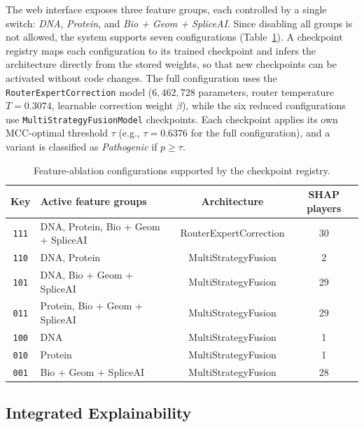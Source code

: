 The web interface exposes three feature groups, each controlled by a single switch: \textit{DNA}, \textit{Protein}, and \textit{Bio + Geom + SpliceAI}. Since disabling all groups is not allowed, the system supports seven configurations (Table~\ref{tab:ablation_configs}). A checkpoint registry maps each configuration to its trained checkpoint and infers the architecture directly from the stored weights, so that new checkpoints can be activated without code changes. The full configuration uses the \texttt{RouterExpertCorrection} model ($6{,}462{,}728$ parameters, router temperature $T = 0.3074$, learnable correction weight $\beta$), while the six reduced configurations use \texttt{MultiStrategyFusionModel} checkpoints. Each checkpoint applies its own MCC-optimal threshold $\tau$ (e.g., $\tau = 0.6376$ for the full configuration), and a variant is classified as \textit{Pathogenic} if $p \geq \tau$.

\begin{table}[htbp]
    \centering
    \caption{Feature-ablation configurations supported by the checkpoint registry.}
    \label{tab:ablation_configs}
    \begin{tabular}{clcc}
        \toprule
        \textbf{Key} & \textbf{Active feature groups} & \textbf{Architecture} & \textbf{SHAP players} \\
        \midrule
        \texttt{111} & DNA, Protein, Bio + Geom + SpliceAI & RouterExpertCorrection & 30 \\
        \texttt{110} & DNA, Protein & MultiStrategyFusion & 2 \\
        \texttt{101} & DNA, Bio + Geom + SpliceAI & MultiStrategyFusion & 29 \\
        \texttt{011} & Protein, Bio + Geom + SpliceAI & MultiStrategyFusion & 29 \\
        \texttt{100} & DNA & MultiStrategyFusion & 1 \\
        \texttt{010} & Protein & MultiStrategyFusion & 1 \\
        \texttt{001} & Bio + Geom + SpliceAI & MultiStrategyFusion & 28 \\
        \bottomrule
    \end{tabular}
\end{table}

\subsection{Integrated Explainability}

